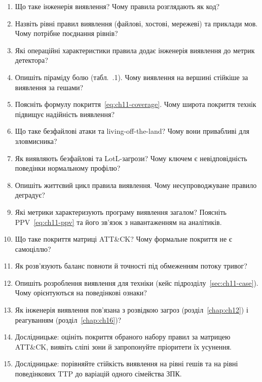 \selfcheck
\begin{enumerate}
\item Що таке інженерія виявлення? Чому правила розглядають як код?
\item Назвіть рівні правил виявлення (файлові, хостові, мережеві) та приклади мов. Чому потрібне поєднання рівнів?
\item Які операційні характеристики правила додає інженерія виявлення до метрик детектора?
\item Опишіть піраміду болю (табл.~\thechapter.1). Чому виявлення на вершині стійкіше за виявлення за гешами?
\item Поясніть формулу покриття~\eqref{eq:ch11-coverage}. Чому широта покриття технік підвищує надійність виявлення?
\item Що таке безфайлові атаки та living-off-the-land? Чому вони привабливі для зловмисника?
\item Як виявляють безфайлові та LotL-загрози? Чому ключем є невідповідність поведінки нормальному профілю?
\item Опишіть життєвий цикл правила виявлення. Чому несупроводжуване правило деградує?
\item Які метрики характеризують програму виявлення загалом? Поясніть PPV~\eqref{eq:ch11-ppv} та його зв'язок з навантаженням на аналітиків.
\item Що таке покриття матриці ATT\&CK? Чому формальне покриття не є самоціллю?
\item Як розв'язують баланс повноти й точності під обмеженням потоку тривог?
\item Опишіть розроблення виявлення для техніки (кейс підрозділу~\ref{sec:ch11-case}). Чому орієнтуються на поведінкові ознаки?
\item Як інженерія виявлення пов'язана з розвідкою загроз (розділ~\ref{chap:ch12}) і реагуванням (розділ~\ref{chap:ch16})?
\item Дослідницьке: оцініть покриття обраного набору правил за матрицею ATT\&CK, виявіть сліпі зони й запропонуйте пріоритети їх усунення.
\item Дослідницьке: порівняйте стійкість виявлення на рівні гешів та на рівні поведінкових TTP до варіацій одного сімейства ЗПК.
\end{enumerate}
